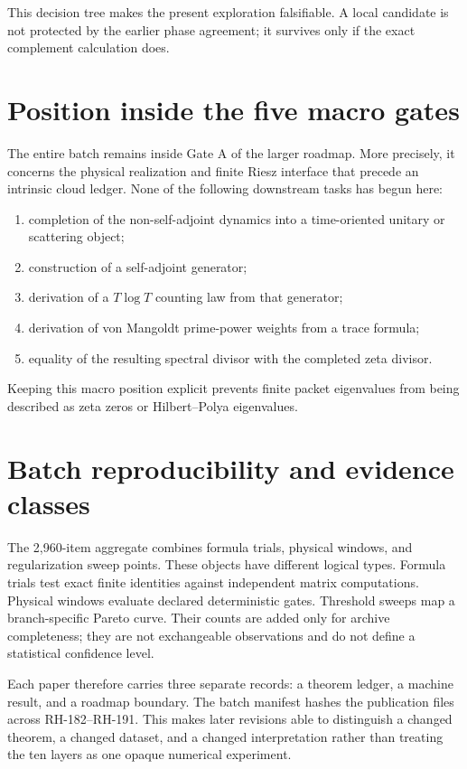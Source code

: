 \documentclass[12pt]{article}
\theoremstyle{remark}
\begin{document}
This decision tree makes the present exploration falsifiable.  A local
candidate is not protected by the earlier phase agreement; it survives only
if the exact complement calculation does.

\section{Position inside the five macro gates}

The entire batch remains inside Gate A of the larger roadmap.  More
precisely, it concerns the physical realization and finite Riesz interface
that precede an intrinsic cloud ledger.  None of the following downstream
tasks has begun here:
\begin{enumerate}[leftmargin=2em]
\item completion of the non-self-adjoint dynamics into a time-oriented
 unitary or scattering object;
\item construction of a self-adjoint generator;
\item derivation of a $T\log T$ counting law from that generator;
\item derivation of von Mangoldt prime-power weights from a trace formula;
\item equality of the resulting spectral divisor with the completed zeta
 divisor.
\end{enumerate}
Keeping this macro position explicit prevents finite packet eigenvalues from
being described as zeta zeros or Hilbert--Polya eigenvalues.

\section{Batch reproducibility and evidence classes}

The 2,960-item aggregate combines formula trials, physical windows, and
regularization sweep points.  These objects have different logical types.
Formula trials test exact finite identities against independent matrix
computations.  Physical windows evaluate declared deterministic gates.
Threshold sweeps map a branch-specific Pareto curve.  Their counts are added
only for archive completeness; they are not exchangeable observations and
do not define a statistical confidence level.

Each paper therefore carries three separate records: a theorem ledger, a
machine result, and a roadmap boundary.  The batch manifest hashes the
publication files across RH-182--RH-191.  This makes later revisions able to
distinguish a changed theorem, a changed dataset, and a changed
interpretation rather than treating the ten layers as one opaque numerical
experiment.
\end{document}
